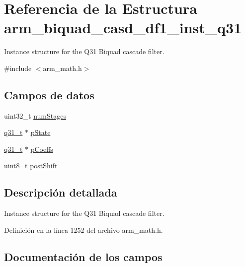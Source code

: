 \hypertarget{structarm__biquad__casd__df1__inst__q31}{}\section{Referencia de la Estructura arm\+\_\+biquad\+\_\+casd\+\_\+df1\+\_\+inst\+\_\+q31}
\label{structarm__biquad__casd__df1__inst__q31}


Instance structure for the Q31 Biquad cascade filter.  




{\ttfamily \#include $<$arm\+\_\+math.\+h$>$}

\subsection*{Campos de datos}
\begin{DoxyCompactItemize}
\item 
uint32\+\_\+t \hyperlink{structarm__biquad__casd__df1__inst__q31_aed9c8a6224cd149e8e12b17b25b9b767}{num\+Stages}
\item 
\hyperlink{arm__math_8h_adc89a3547f5324b7b3b95adec3806bc0}{q31\+\_\+t} $\ast$ \hyperlink{structarm__biquad__casd__df1__inst__q31_adee4ba3ee8869865af7d8fa08ca913d6}{p\+State}
\item 
\hyperlink{arm__math_8h_adc89a3547f5324b7b3b95adec3806bc0}{q31\+\_\+t} $\ast$ \hyperlink{structarm__biquad__casd__df1__inst__q31_a68888e36167d81cb7836db10367a1682}{p\+Coeffs}
\item 
uint8\+\_\+t \hyperlink{structarm__biquad__casd__df1__inst__q31_a74050e9f36542bd56f4052381a82ae8f}{post\+Shift}
\end{DoxyCompactItemize}


\subsection{Descripción detallada}
Instance structure for the Q31 Biquad cascade filter. 

Definición en la línea 1252 del archivo arm\+\_\+math.\+h.



\subsection{Documentación de los campos}
